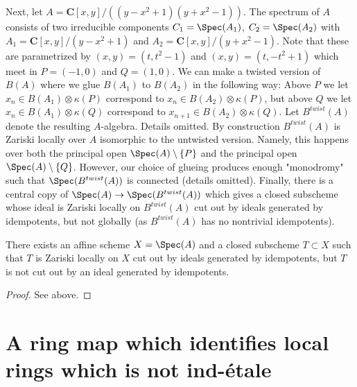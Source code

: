 \medskip\noindent
Next, let $A = \mathbf{C}[x, y]/((y - x^2 + 1)(y + x^2 - 1))$.
The spectrum of $A$ consists of two irreducible components
$C_1 = \Spec(A_1)$, $C_2 = \Spec(A_2)$
with $A_1 = \mathbf{C}[x, y]/(y - x^2 + 1)$ and
$A_2 = \mathbf{C}[x, y]/(y + x^2 - 1)$. Note that these are
parametrized by $(x, y) = (t, t^2 - 1)$ and $(x, y) = (t, -t^2 + 1)$
which meet in $P = (-1, 0)$ and $Q = (1, 0)$. We can make a twisted
version of $B(A)$ where we glue $B(A_1)$ to $B(A_2)$ in the following
way: Above $P$ we let $x_n \in B(A_1) \otimes \kappa(P)$
correspond to $x_n \in B(A_2) \otimes \kappa(P)$, but above $Q$
we let $x_n \in B(A_1) \otimes \kappa(Q)$
correspond to $x_{n + 1} \in B(A_2) \otimes \kappa(Q)$.
Let $B^{twist}(A)$ denote the resulting $A$-algebra.
Details omitted. By construction
$B^{twist}(A)$ is Zariski locally over $A$ isomorphic to the untwisted
version. Namely, this happens over both the principal open
$\Spec(A) \setminus \{P\}$
and the principal open $\Spec(A) \setminus \{Q\}$.
However, our choice of glueing produces enough "monodromy" such that
$\Spec(B^{twist}(A))$ is connected (details omitted).
Finally, there is a central copy of
$\Spec(A) \to \Spec(B^{twist}(A))$
which gives a closed subscheme whose ideal is Zariski locally
on $B^{twist}(A)$ cut out by ideals generated by idempotents, but
not globally (as $B^{twist}(A)$ has no nontrivial idempotents).

\begin{lemma}
\label{lemma-not-generated-idempotents}
There exists an affine scheme $X = \Spec(A)$ and a
closed subscheme $T \subset X$ such that $T$ is Zariski locally
on $X$ cut out by ideals generated by idempotents, but
$T$ is not cut out by an ideal generated by idempotents.
\end{lemma}

\begin{proof}
See above.
\end{proof}



\section{A ring map which identifies local rings which is not ind-\'etale}
\label{section-not-ind-etale}

